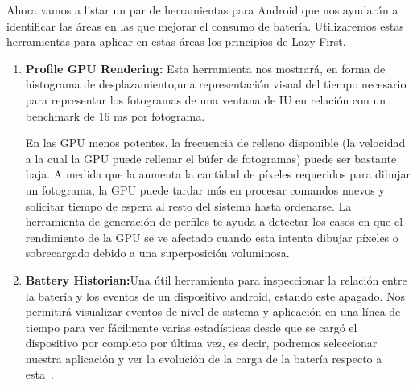 Ahora vamos a listar un par de herramientas para Android que nos
 ayudarán a identificar las áreas en las que mejorar el consumo de batería. 
Utilizaremos estas herramientas para aplicar en estas áreas los 
principios de Lazy First.

\begin{enumerate}
\item \textbf{Profile GPU Rendering:} Esta herramienta nos mostrará,
 en forma de histograma de desplazamiento,una representación visual 
del tiempo necesario para representar los fotogramas de una ventana
 de IU en relación con un benchmark de 16 ms por fotograma.

En las GPU menos potentes, la frecuencia de relleno disponible
 (la velocidad a la cual la GPU puede rellenar el búfer de fotogramas)
 puede ser bastante baja. A medida que la aumenta la cantidad de 
píxeles requeridos para dibujar un fotograma, la GPU puede tardar
 más en procesar comandos nuevos y solicitar tiempo de espera al 
resto del sistema hasta ordenarse. La herramienta de generación 
de perfiles te ayuda a detectar los casos en que el rendimiento de
 la GPU se ve afectado cuando esta intenta dibujar píxeles o 
sobrecargado debido a una superposición voluminosa.
\item \textbf{Battery Historian:}Una útil herramienta para inspeccionar
 la relación entre la batería y los eventos de un dispositivo android,
 estando este apagado. Nos permitirá visualizar eventos de nivel de sistema 
y aplicación en una línea de tiempo para ver fácilmente varias estadísticas 
desde que se cargó el dispositivo por completo por última vez, es decir, 
podremos seleccionar nuestra aplicación y ver la evolución de la carga de
 la batería respecto a esta~\cite{BATTERYHISTORIAN}.

\end{enumerate}